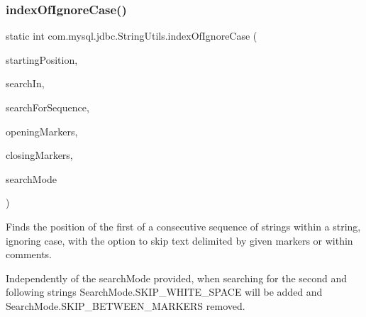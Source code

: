 \subsubsection{\texorpdfstring{index\+Of\+Ignore\+Case()}{indexOfIgnoreCase()}\hspace{0.1cm}{\footnotesize\ttfamily [3/5]}}
{\footnotesize\ttfamily static int com.\+mysql.\+jdbc.\+String\+Utils.\+index\+Of\+Ignore\+Case (\begin{DoxyParamCaption}\item[{int}]{starting\+Position,  }\item[{String}]{search\+In,  }\item[{String \mbox{[}$\,$\mbox{]}}]{search\+For\+Sequence,  }\item[{String}]{opening\+Markers,  }\item[{String}]{closing\+Markers,  }\item[{Set$<$ \mbox{\hyperlink{enumcom_1_1mysql_1_1jdbc_1_1_string_utils_1_1_search_mode}{Search\+Mode}} $>$}]{search\+Mode }\end{DoxyParamCaption})\hspace{0.3cm}{\ttfamily [static]}}

Finds the position of the first of a consecutive sequence of strings within a string, ignoring case, with the option to skip text delimited by given markers or within comments. 

Independently of the {\ttfamily search\+Mode} provided, when searching for the second and following strings {\ttfamily Search\+Mode.\+S\+K\+I\+P\+\_\+\+W\+H\+I\+T\+E\+\_\+\+S\+P\+A\+CE} will be added and {\ttfamily Search\+Mode.\+S\+K\+I\+P\+\_\+\+B\+E\+T\+W\+E\+E\+N\+\_\+\+M\+A\+R\+K\+E\+RS} removed. 


